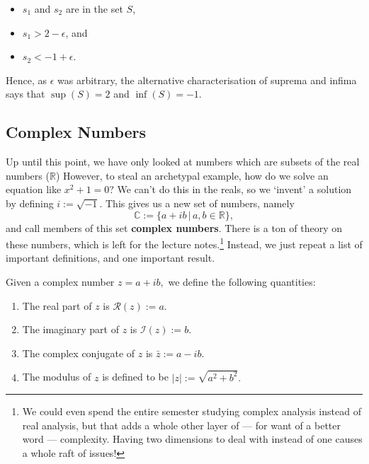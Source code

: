 \documentclass[
  12pt,
  a4paper]{extarticle}
\providecommand{\tightlist}{%
  \setlength{\itemsep}{0pt}\setlength{\parskip}{0pt}}
\theoremstyle{plain}
\theoremstyle{definition}
\theoremstyle{plain}
\theoremstyle{plain}
\theoremstyle{plain}
\theoremstyle{plain}
\theoremstyle{definition}
\theoremstyle{definition}
\theoremstyle{remark}
\theoremstyle{remark}
\let\BeginKnitrBlock\begin \let\EndKnitrBlock\end
\renewcommand{\;}{\,}
\begin{document}
\begin{itemize}
\tightlist
\item
  \(s_1\) and \(s_2\) are in the set \(S\),
\item
  \(s_1 > 2 - \epsilon\), and
\item
  \(s_2 < -1 + \epsilon\).
\end{itemize}

Hence, as \(\epsilon\) was arbitrary, the alternative characterisation of suprema and infima says that \(\sup(S) = 2\) and \(\inf(S) = -1\).

\hypertarget{complex-numbers}{%
\subsection{Complex Numbers}\label{complex-numbers}}

Up until this point, we have only looked at numbers which are subsets of the real numbers (\(\mathbb{R}\)) However, to steal an archetypal example, how do we solve an equation like \(x^2 + 1 = 0\)? We can't do this in the reals, so we `invent' a solution by defining \(i:=\sqrt{-1}.\) This gives us a new set of numbers, namely \[\mathbb{C}:= \lbrace a + ib \;\lvert\; a,b\in\mathbb{R}\rbrace,\] and call members of this set \textbf{complex numbers}. There is a ton of theory on these numbers, which is left for the lecture notes.\footnote{We could even spend the entire semester studying complex analysis instead of real analysis, but that adds a whole other layer of --- for want of a better word --- complexity. Having two dimensions to deal with instead of one causes a whole raft of issues!} Instead, we just repeat a list of important definitions, and one important result.

\BeginKnitrBlock{definition}[Complex Numbers]
{\label{def:def0} }Given a complex number \(z = a + ib,\) we define the following quantities:

\begin{enumerate}
\def\labelenumi{\roman{enumi})}
\tightlist
\item
  The real part of \(z\) is \(\mathcal{R}(z) := a.\)
\item
  The imaginary part of \(z\) is \(\mathcal{I}(z) := b.\)
\item
  The complex conjugate of \(z\) is \(\bar{z}:= a - ib.\)
\item
  The modulus of \(z\) is defined to be \(\lvert z \rvert := \sqrt{a^2 + b^2}.\)
\end{enumerate}
\EndKnitrBlock{definition}
\end{document}
